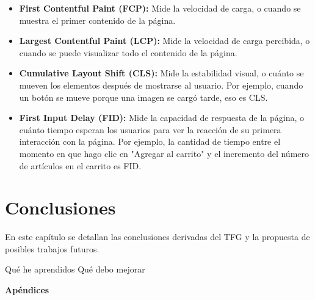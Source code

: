 \documentclass[12pt,twoside,titlepage]{report}
\newcommand\blankpage{%
    \newpage
    \null
    \thispagestyle{empty}%
    \newpage}
\begin{document}
\begin{itemize}
    \item\textbf{First Contentful Paint (FCP):} Mide la velocidad de carga, o cuando se muestra el primer contenido de la página.
    \item\textbf{Largest Contentful Paint (LCP):} Mide la velocidad de carga percibida, o cuando se puede visualizar todo el contenido de la página.
    \item\textbf{Cumulative Layout Shift (CLS):} Mide la estabilidad visual, o cuánto se mueven los elementos después de mostrarse al usuario. Por ejemplo, cuando un botón se mueve porque una imagen se cargó tarde, eso es CLS.
    \item\textbf{First Input Delay (FID):} Mide la capacidad de respuesta de la página, o cuánto tiempo esperan los usuarios para ver la reacción de su primera interacción con la página. Por ejemplo, la cantidad de tiempo entre el momento en que hago clic en "Agregar al carrito" y el incremento del número de artículos en el carrito es FID.
\end{itemize}

\newpage

\chapter{Conclusiones}

En este capítulo se detallan las conclusiones derivadas del TFG y la propuesta de posibles trabajos futuros.

Qué he aprendidos
Qué debo mejorar

\blankpage




{}
\footnotesize{
%


}
\raggedbottom
\afterpage{\blankpage}
\newpage



\appendix
{}
{}
\mbox{}
\vfill
\begin{center}
\begin{Huge}
\textbf{Apéndices}
\end{Huge}
\end{center}
\vfill
\mbox{}
\thispagestyle{empty}
\newpage
\mbox{}
\thispagestyle{empty}
\newpage
\end{document}
